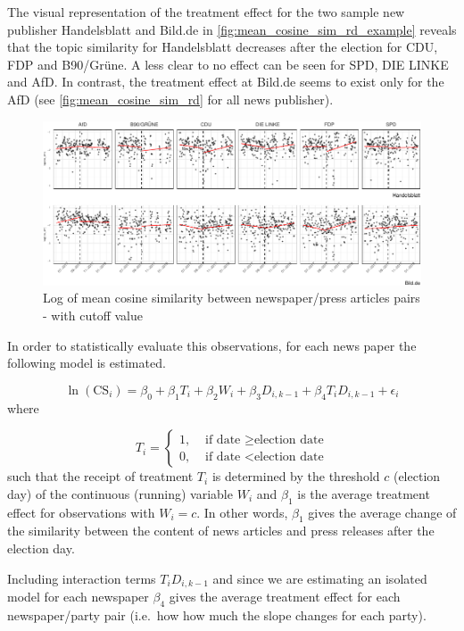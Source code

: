 \documentclass[
]{article}
\begin{document}
The visual representation of the treatment effect for the two sample new
publisher Handelsblatt and Bild.de in
\autoref{fig:mean_cosine_sim_rd_example} reveals that the topic
similarity for Handelsblatt decreases after the election for CDU, FDP
and B90/Grüne. A less clear to no effect can be seen for SPD, DIE LINKE
and AfD. In contrast, the treatment effect at Bild.de seems to exist
only for the AfD (see \autoref{fig:mean_cosine_sim_rd} for all news
publisher).

\begin{figure}

{\centering \includegraphics[width=0.9\linewidth]{main_text_files/figure-latex/Daily mean cosine similarity - rd example-1} 

}

\caption{Log of mean cosine similarity between newspaper/press articles pairs - with cutoff value \label{fig:mean_cosine_sim_rd_example}}\label{fig:Daily mean cosine similarity - rd example}
\end{figure}

In order to statistically evaluate this observations, for each news
paper the following model is estimated.

\[
\ln(\text{CS}_{i})=\beta_0+\beta_1T_i+\beta_2W_{i}+\beta_3D_{i,k-1}+\beta_4T_iD_{i,k-1}+\epsilon_i
\] where

\[
T_i = 
\begin{cases}
1, & \text{ if date } \geq \text{election date} \\
0, & \text{ if date } < \text{election date}
\end{cases}
\] such that the receipt of treatment \(T_i\) is determined by the
threshold \(c\) (election day) of the continuous (running) variable
\(W_i\) and \(\beta_1\) is the average treatment effect for observations
with \(W_i = c\). In other words, \(\beta_1\) gives the average change
of the similarity between the content of news articles and press
releases after the election day.

Including interaction terms \(T_iD_{i,k-1}\) and since we are estimating
an isolated model for each newspaper \(\beta_4\) gives the average
treatment effect for each newspaper/party pair (i.e.~how how much the
slope changes for each party).
\end{document}
